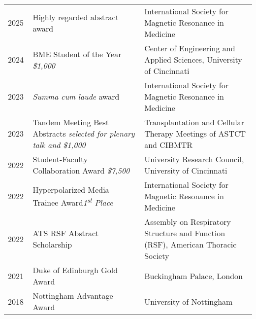\documentclass[12pt,]{scrartcl}
\begin{document}
\begin{table}[!h]
{\def\arraystretch{1.5}\tabcolsep=0pt
\begin{tabular}{p{0.10\linewidth}p{0.45\linewidth}p{0.45\linewidth}}
    2025 & Highly regarded abstract award  & International Society for Magnetic Resonance in Medicine \\

    2024 & BME Student of the Year \newline \textit{\$1,000}  & Center of Engineering and Applied Sciences, University of Cincinnati \\
    
    2023 & \textit{Summa cum laude} award & International Society for Magnetic Resonance in Medicine \\

    
    2023 & Tandem Meeting Best Abstracts \newline \textit{selected for plenary talk and \$1,000}  & Transplantation and Cellular Therapy \newline Meetings of ASTCT and CIBMTR \\
    
    2022 & Student-Faculty Collaboration Award \newline \textit{\$7,500} & University Research Council, University of Cincinnati \\
    
    2022 & Hyperpolarized Media Trainee Award\newline \textit{1\textsuperscript{st} Place} & International Society for Magnetic Resonance in Medicine \\
    
    
    2022 & ATS RSF Abstract Scholarship & Assembly on Respiratory Structure and Function (RSF), American Thoracic Society \\ 

  
  2021 & Duke of Edinburgh Gold Award & Buckingham Palace, London \\
  
  2018 & Nottingham Advantage Award & University of Nottingham \\

\end{tabular}%
}
\end{table}
\end{document}
